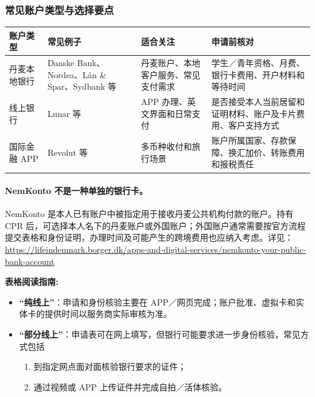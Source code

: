 \subsubsection{常见账户类型与选择要点}
\begin{table}[H]
  \scriptsize
  \centering
  \label{tab:bank_compare_new}
  \renewcommand{\arraystretch}{1.25}
  \setlength{\tabcolsep}{5pt}
  \begin{tabularx}{\textwidth}{p{} p{} X X}
    \toprule
    \textbf{账户类型} & \textbf{常见例子} & \textbf{适合关注} & \textbf{申请前核对} \\
    \midrule
    丹麦本地银行 & Danske Bank、Nordea、Lån \& Spar、Sydbank 等 & 丹麦账户、本地客户服务、常见支付需求 & 学生／青年资格、月费、银行卡费用、开户材料和等待时间 \\
    线上银行 & Lunar 等 & APP 办理、英文界面和日常支付 & 是否接受本人当前居留和证明材料、账户及卡片费用、客户支持方式 \\
    国际金融 APP & Revolut 等 & 多币种收付和旅行场景 & 账户所属国家、存款保障、换汇加价、转账费用和报税责任 \\
    \bottomrule
  \end{tabularx}
\end{table}

\paragraph{NemKonto 不是一种单独的银行卡。}
NemKonto 是本人已有账户中被指定用于接收丹麦公共机构付款的账户。持有 CPR 后，可选择本人名下的丹麦账户或外国账户；外国账户通常需要按官方流程提交表格和身份证明，办理时间及可能产生的跨境费用也应纳入考虑。详见：
\url{https://lifeindenmark.borger.dk/apps-and-digital-services/nemkonto-your-public-bank-account}

\begin{grayleftbox}
\small
\textbf{表格阅读指南: }
\begin{itemize}
  \item \textbf{“纯线上”}：申请和身份核验主要在 APP／网页完成；账户批准、虚拟卡和实体卡的提供时间以服务商实际审核为准。
  
  \item \textbf{“部分线上”}：申请表可在网上填写，但银行可能要求进一步身份核验，常见方式包括
    \begin{enumerate}[leftmargin=2em,label=\arabic*.]
      \item 到指定网点面对面核验银行要求的证件；
      \item 通过视频或 APP 上传证件并完成自拍／活体核验。
    \end{enumerate}
\end{itemize}
\end{grayleftbox}

